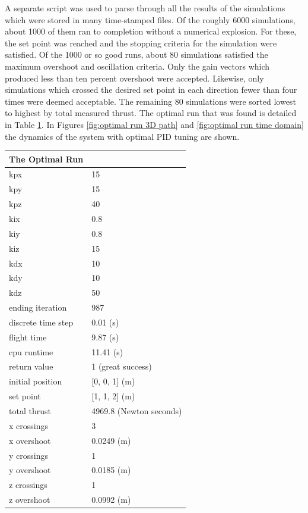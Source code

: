 A separate script was used to parse through all the results of the simulations which were stored in many time-stamped files. Of the roughly 6000 simulations, about 1000 of them ran to completion without a numerical explosion. For these, the set point was reached and the stopping criteria for the simulation were satisfied. Of the 1000 or so good runs, about 80 simulations satisfied the maximum overshoot and oscillation criteria. Only the gain vectors which produced less than ten percent overshoot were accepted. Likewise, only simulations which crossed the desired set point in each direction fewer than four times were deemed acceptable. The remaining 80 simulations were sorted lowest to highest by total measured thrust. The optimal run that was found is detailed in Table \ref{table:optimalrun}. In Figures \ref{fig:optimal run 3D path} and \ref{fig:optimal run time domain} the dynamics of the system with optimal PID tuning are shown. 


\begin{table}\label{table:optimalrun}
\begin{doublespace}
\centering
\begin{tabular}{l l}
The Optimal Run      \\
\hline                        
kpx                 & 15 \\
kpy                 & 15 \\
kpz                 & 40 \\
kix                 & 0.8 \\
kiy                 & 0.8 \\
kiz                 & 15 \\
kdx                 & 10 \\
kdy                 & 10 \\
kdz                 & 50 \\
ending iteration    & 987 \\
discrete time step   & 0.01 (s)\\
flight time         & 9.87 (s) \\
cpu runtime         & 11.41 (s)\\
return value        & 1 (great success)\\
initial position    & [0, 0, 1] (m)\\
set point           & [1, 1, 2] (m) \\
total thrust        & 4969.8 (Newton seconds) \\
x crossings         & 3 \\
x overshoot         & 0.0249 (m) \\
y crossings         & 1 \\
y overshoot         & 0.0185 (m)\\
z crossings         & 1 \\
z overshoot         & 0.0992 (m) \\
\end{tabular}
\end{doublespace}
\end{table}


